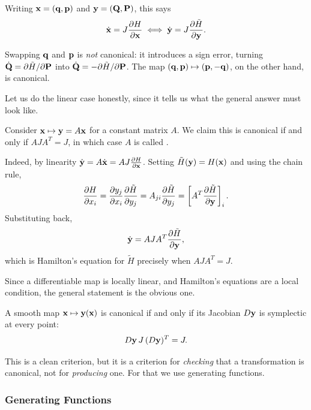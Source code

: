 \documentclass[a4paper]{scrartcl}
\begin{document}
Writing $\mathbf{x} = (\mathbf{q}, \mathbf{p})$ and $\mathbf{y} = (\mathbf{Q}, \mathbf{P})$, this says
$$
\dot{\mathbf{x}} = J\frac{\partial H}{\partial \mathbf{x}} \iff \dot{\mathbf{y}} = J \frac{\partial \tilde H}{\partial \mathbf{y}}.
$$

\begin{example}
	Swapping $\mathbf{q}$ and $\mathbf{p}$ is \emph{not} canonical: it introduces a sign error, turning $\dot{\mathbf{Q}} = \partial \tilde H/\partial \mathbf{P}$ into $\dot{\mathbf{Q}} = -\partial \tilde H/\partial \mathbf{P}$. The map $(\mathbf{q}, \mathbf{p})\mapsto (\mathbf{p}, -\mathbf{q})$, on the other hand, is canonical.
\end{example}

Let us do the linear case honestly, since it tells us what the general answer must look like.

\begin{example}
	Consider $\mathbf{x} \mapsto \mathbf{y} = A\mathbf{x}$ for a constant matrix $A$. We claim this is canonical if and only if $AJA^T = J$, in which case $A$ is called .

	Indeed, by linearity $\dot{\mathbf{y}} = A \dot{\mathbf{x}} = AJ\frac{\partial H}{\partial \mathbf{x}}$. Setting $\tilde H(\mathbf{y}) = H(\mathbf{x})$ and using the chain rule,
	$$
	\frac{\partial H}{\partial x_i} = \frac{\partial y_j}{\partial x_i}\frac{\partial \tilde H}{\partial y_j} = A_{ji}\frac{\partial \tilde H}{\partial y_j} = \left[A^T\frac{\partial \tilde H}{\partial \mathbf{y}}\right]_i.
	$$
	Substituting back,
	$$
	\dot{\mathbf{y}} = AJA^T\frac{\partial \tilde H}{\partial \mathbf{y}},
	$$
	which is Hamilton's equation for $\tilde H$ precisely when $AJA^T = J$.
\end{example}

Since a differentiable map is locally linear, and Hamilton's equations are a local condition, the general statement is the obvious one.

\begin{proposition}
	A smooth map $\mathbf{x} \mapsto \mathbf{y}(\mathbf{x})$ is canonical if and only if its Jacobian $D\mathbf{y}$ is symplectic at every point:
	$$
	D\mathbf{y}\, J\, (D\mathbf{y})^T = J.
	$$
\end{proposition}

This is a clean criterion, but it is a criterion for \emph{checking} that a transformation is canonical, not for \emph{producing} one. For that we use generating functions.

\subsubsection{Generating Functions}
\end{document}
